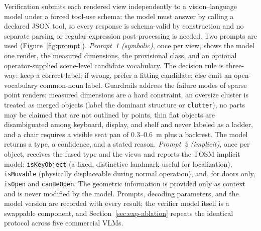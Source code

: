 Verification submits each rendered view independently to a vision--language
model under a forced tool-use schema: the model must answer by calling a
declared JSON tool, so every response is schema-valid by construction and no
separate parsing or regular-expression post-processing is needed. Two prompts
are used (Figure~\ref{fig:prompt}). \emph{Prompt~1 (symbolic)}, once per
view, shows the model one render, the measured dimensions, the provisional
class, and an optional operator-supplied scene-level candidate vocabulary. The
decision rule is three-way: keep a correct label; if wrong, prefer a fitting
candidate; else emit an open-vocabulary common-noun label. Guardrails address
the failure modes of sparse point renders: measured dimensions are a hard
constraint, an oversize cluster is treated as merged objects (label the
dominant structure or \texttt{clutter}), no parts may be claimed that are not
outlined by points, thin flat objects are disambiguated among keyboard,
display, and shelf and never labeled as a ladder, and a chair requires a
visible seat pan of 0.3--0.6~m plus a backrest. The model returns a type, a
confidence, and a stated reason. \emph{Prompt~2 (implicit)}, once per object,
receives the fused type and the views and reports the TOSM implicit model:
\texttt{isKeyObject} (a fixed, distinctive landmark useful for localization),
\texttt{isMovable} (physically displaceable during normal operation), and, for
doors only, \texttt{isOpen} and \texttt{canBeOpen}. The geometric information
is provided only as context and is never modified by the model. Prompts,
decoding parameters, and the model version are recorded with every result; the
verifier model itself is a swappable component, and
Section~\ref{sec:exp-ablation} repeats the identical protocol across five
commercial VLMs.

